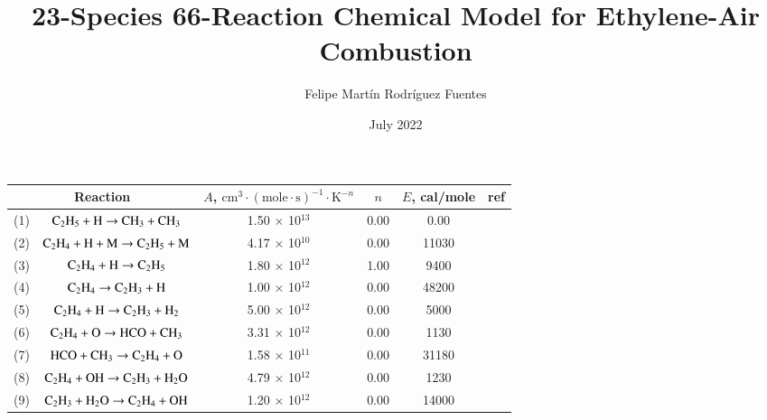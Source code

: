 \documentclass{warpdoc}
\author{
  Felipe Martín Rodríguez Fuentes
}
\title{23-Species 66-Reaction Chemical Model for Ethylene-Air
Combustion
}
\date{
  July 2022
}
\renewcommand{\fontsizetable}{\footnotesize\scalefont{0.9}}
\begin{document}
  \pagestyle{headings}
  \setcounter{page}{1}
  \makewarpdoctitle



\begin{table}[h]
\fontsizetable
\begin{center}
\begin{threeparttable}
\begin{tabular}{cccccc} 
\toprule
\multicolumn{2}{c}{Reaction \tnote{a,~b}} & $A$, $\textrm{cm}^3\cdot(\textrm{mole}\cdot \textrm{s})^{-1}\cdot \textrm{K}^{-n}$ & $n$ & $E$, cal/mole & ref \\ 
\midrule
(1) & $\rm C_2 H_5 + H \rightarrow CH_3 + CH_3$  & 1.50 $\times$ 10$^{13}$  & 0.00 & 0.00  & \cite{pci:2015:saghafian}\\

(2) & $\rm C_2 H_4 + H + M\rightarrow C_2 H_5 + M$  & 4.17 $\times$ 10$^{10}$  & 0.00 & 11030&\cite{pci:2015:saghafian} \\

(3) & $\rm C_2 H_4 + H\rightarrow C_2 H_5 $ & 1.80 $\times$ 10$^{12}$  & 1.00 & 9400 &\cite{ef:2017:zettervall}\\

(4) & $\rm C_2 H_4\rightarrow C_2 H_3 +H $ & 1.00 $\times$ 10$^{12}$  & 0.00 & 48200 &\cite{ef:2017:zettervall}\\

(5) & $\rm C_2 H_4 + H \rightarrow C_2 H_3 +H_2 $ & 5.00 $\times$ 10$^{12}$  & 0.00 & 5000 &\cite{ef:2017:zettervall}\\

(6) & $\rm C_2 H_4 + O \rightarrow HCO + CH_3$ & 3.31 $\times$ 10$^{12}$  & 0.00 & 1130 & \cite{caf:1989:refael}\\

(7) & $\rm HCO + CH_3 \rightarrow C_2 H_4 + O$ & 1.58 $\times$ 10$^{11}$  & 0.00 & 31180 &\cite{caf:1989:refael}\\

(8) & $\rm C_2 H_4 + OH \rightarrow C_2 H_3 + H_2 O$ & 4.79 $\times$ 10$^{12}$  & 0.00 & 1230 &\cite{caf:1989:refael}\\

(9) & $\rm  C_2 H_3 + H_2 O \rightarrow C_2 H_4 + OH  $ & 1.20 $\times$ 10$^{12}$  & 0.00 & 14000 &\cite{caf:1989:refael}\\


\end{tabular}
\end{threeparttable}
\end{center}
\end{table}
\end{document}
